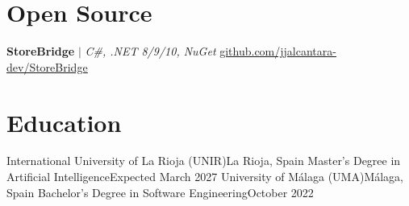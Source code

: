 \documentclass[a4paper,10pt]{article}
\begin{document}
  \resumeSubHeadingListEnd

\vspace{-4pt}

\section{Open Source}
  \resumeSubHeadingListStart
    \resumeProjectHeading
      {\textbf{StoreBridge} $|$ \emph{C\#, .NET 8/9/10, NuGet}}
      {\href{https://github.com/jjalcantara-dev/StoreBridge}{\underline{github.com/jjalcantara-dev/StoreBridge}}}
    \resumeItemListStart
    \resumeItemListEnd
  \resumeSubHeadingListEnd

\vspace{-4pt}

\section{Education}
  \resumeSubHeadingListStart
    \resumeSubheading
      {International University of La Rioja (UNIR)}{La Rioja, Spain}
      {Master's Degree in Artificial Intelligence}{Expected March 2027}
    \resumeSubheading
      {University of Málaga (UMA)}{Málaga, Spain}
      {Bachelor's Degree in Software Engineering}{October 2022}
  \resumeSubHeadingListEnd

\vspace{-4pt}

\end{document}
